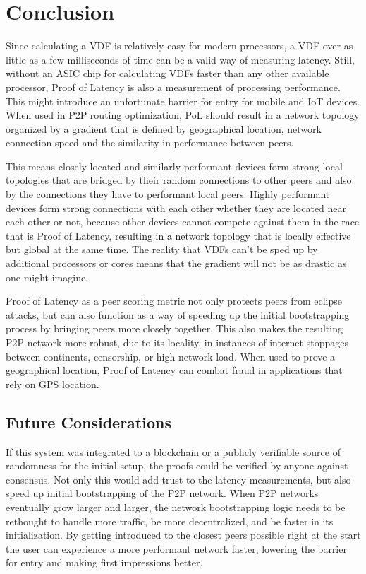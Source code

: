 \chapter{Conclusion}
\label{Conclusion}
Since calculating a VDF is relatively easy for modern processors, a VDF over as little as a few milliseconds of time can be a valid way of measuring latency. Still, without an ASIC chip for calculating VDFs faster than any other available processor, Proof of Latency is also a measurement of processing performance. This might introduce an unfortunate barrier for entry for mobile and IoT devices. When used in P2P routing optimization, PoL should result in a network topology organized by a gradient that is defined by geographical location, network connection speed and the similarity in performance between peers.

This means closely located and similarly performant devices form strong local topologies that are bridged by their random connections to other peers and also by the connections they have to performant local peers. Highly performant devices form strong connections with each other whether they are located near each other or not, because other devices cannot compete against them in the race that is Proof of Latency, resulting in a network topology that is locally effective but global at the same time. The reality that VDFs can't be sped up by additional processors or cores means that the gradient will not be as drastic as one might imagine.

Proof of Latency as a peer scoring metric not only protects peers from eclipse attacks, but can also function as a way of speeding up the initial bootstrapping process by bringing peers more closely together. This also makes the resulting P2P network more robust, due to its locality, in instances of internet stoppages between continents, censorship, or high network load. When used to prove a geographical location, Proof of Latency can combat fraud in applications that rely on GPS location.

\section{Future Considerations}
If this system was integrated to a blockchain or a publicly verifiable source of randomness for the initial setup, the proofs could be verified by anyone against consensus. Not only this would add trust to the latency measurements, but also speed up initial bootstrapping of the P2P network. When P2P networks eventually grow larger and larger, the network bootstrapping logic needs to be rethought to handle more traffic, be more decentralized, and be faster in its initialization. By getting introduced to the closest peers possible right at the start the user can experience a more performant network faster, lowering the barrier for entry and making first impressions better.

